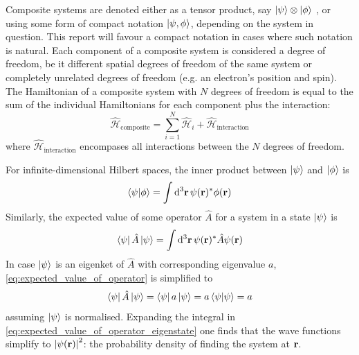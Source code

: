 \documentclass[nofootinbib,reprint,english]{revtex4-1}
\newcommand{\hatHH}{\hat{\mathcal{H}}}
\begin{document}
Composite systems are denoted either as a tensor product, say \(\ket{\psi}\otimes\ket{\phi}\) , or using some form of compact notation \(\ket{\psi,\phi}\), depending on the system in question. This report will favour a compact notation in cases where such notation is natural. Each component of a composite system is considered a degree of freedom, be it different spatial degrees of freedom of the same system or completely unrelated degrees of freedom (e.g. an electron's position and spin). The Hamiltonian of a composite system with \(N\) degrees of freedom is equal to the sum of the individual Hamiltonians for each component plus the interaction:
\begin{equation}\label{eq:Composite_Hamiltonian}
\hatHH_\text{composite}=\sum_{i=1}^N\hatHH_{i}+\hatHH_\text{interaction}
\end{equation}
where \(\hatHH_\text{interaction}\) encompases all interactions between the \(N\) degrees of freedom.

For infinite-dimensional Hilbert spaces, the inner product between \(\ket{\psi}\) and \(\ket{\phi}\) is
\begin{equation}
\braket{\psi}{\phi}=\int\dd[3]{\vb{r}}\psi(\vb{r})^*\phi(\vb{r})
\end{equation}
Similarly, the expected value of some operator \(\hat{A}\) for a system in a state \(\ket{\psi}\) is
\begin{equation}\label{eq:expected_value_of_operator}
\bra{\psi}\hat{A}\ket{\psi}=\int\dd[3]{\vb{r}}\psi(\vb{r})^*\hat{A}\psi(\vb{r})
\end{equation}
In case \(\ket{\psi}\) is an eigenket of \(\hat{A}\) with corresponding eigenvalue \(a\), \eqref{eq:expected_value_of_operator} is simplified to
\begin{equation}\label{eq:expected_value_of_operator_eigenstate}
\bra{\psi}\hat{A}\ket{\psi}=\bra{\psi}a\ket{\psi}=a\braket{\psi}{\psi}=a
\end{equation}
assuming \(\ket{\psi}\) is normalised. Expanding the integral in \eqref{eq:expected_value_of_operator_eigenstate} one finds that the wave functions simplify to \(\abs{\psi(\vb{r})}^2\): the probability density of finding the system at \(\vb{r}\).
\end{document}

